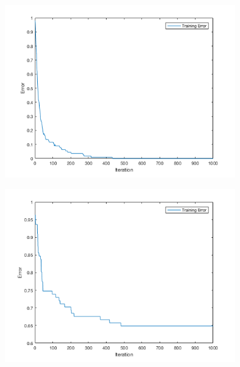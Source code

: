 \documentclass[12pt]{article}
\begin{document}
\begin{center}
  \begin{table}[H]
    \begin{varwidth}[b]{0.4\linewidth}
      \centering
      \label{table:YNYNN}
    \end{varwidth}%
    \hfill
    \begin{minipage}[b]{0.6\linewidth}
      \centering
      \includegraphics[width=100mm]{YNYNN_training_error.png}
      \label{fig:YNYNN}
    \end{minipage}
  \end{table}
\end{center}

\begin{center}
  \begin{table}[H]
    \begin{varwidth}[b]{0.4\linewidth}
      \centering
      \label{table:YNNYN}
    \end{varwidth}%
    \hfill
    \begin{minipage}[b]{0.6\linewidth}
      \centering
      \includegraphics[width=100mm]{YNNYN_training_error.png}
      \label{fig:YNNYN}
    \end{minipage}
  \end{table}
\end{center}
\end{document}
